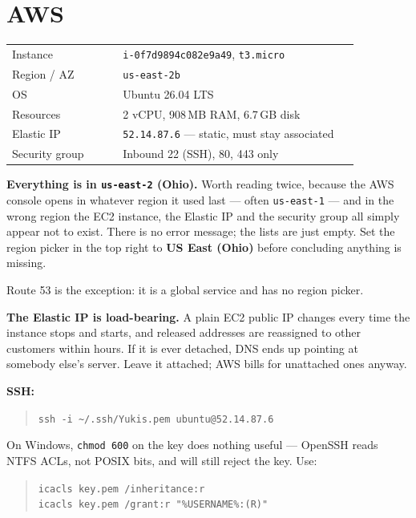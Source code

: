 \documentclass[11pt,a4paper]{article}
\newenvironment{callout}
  {\par\medskip\noindent\begin{list}{}{%
     \setlength{\leftmargin}{1.2em}\setlength{\rightmargin}{0pt}%
     \setlength{\labelwidth}{0pt}\setlength{\itemindent}{0pt}}%
   \item[]\color{ink}\hspace{-1.2em}%
   \makebox[0pt][l]{\raisebox{-0.35\baselineskip}[0pt][0pt]{%
     \textcolor{gold}{\rule{2pt}{1.15\baselineskip}}}}\hspace{1.2em}\ignorespaces}
  {\end{list}\medskip}
\newcommand{\lead}[1]{\textbf{\color{ink}#1}}
\newcommand{\code}[1]{\texttt{\small #1}}
\begin{document}
\section{AWS}

\begin{longtable}{@{}p{0.30\linewidth}p{0.64\linewidth}@{}}
\toprule
Instance      & \code{i-0f7d9894c082e9a49}, \code{t3.micro} \\
Region / AZ   & \code{us-east-2b} \\
OS            & Ubuntu 26.04 LTS \\
Resources     & 2 vCPU, 908\,MB RAM, 6.7\,GB disk \\
Elastic IP    & \code{52.14.87.6} --- static, must stay associated \\
Security group& Inbound 22 (SSH), 80, 443 only \\
\bottomrule
\end{longtable}

\begin{callout}
\lead{Everything is in \code{us-east-2} (Ohio).} Worth reading twice, because
the AWS console opens in whatever region it used last --- often
\code{us-east-1} --- and in the wrong region the EC2 instance, the Elastic IP
and the security group all simply appear not to exist. There is no error
message; the lists are just empty. Set the region picker in the top right to
\textbf{US East (Ohio)} before concluding anything is missing.

Route 53 is the exception: it is a global service and has no region picker.
\end{callout}

\begin{callout}
\lead{The Elastic IP is load-bearing.} A plain EC2 public IP changes every time
the instance stops and starts, and released addresses are reassigned to other
customers within hours. If it is ever detached, DNS ends up pointing at
somebody else's server. Leave it attached; AWS bills for unattached ones
anyway.
\end{callout}

\lead{SSH:}
\begin{quote}\code{ssh -i \textasciitilde/.ssh/Yukis.pem ubuntu@52.14.87.6}\end{quote}

On Windows, \code{chmod 600} on the key does nothing useful --- OpenSSH reads
NTFS ACLs, not POSIX bits, and will still reject the key. Use:
\begin{quote}
\code{icacls key.pem /inheritance:r}\\
\code{icacls key.pem /grant:r "\%USERNAME\%:(R)"}
\end{quote}
\end{document}
